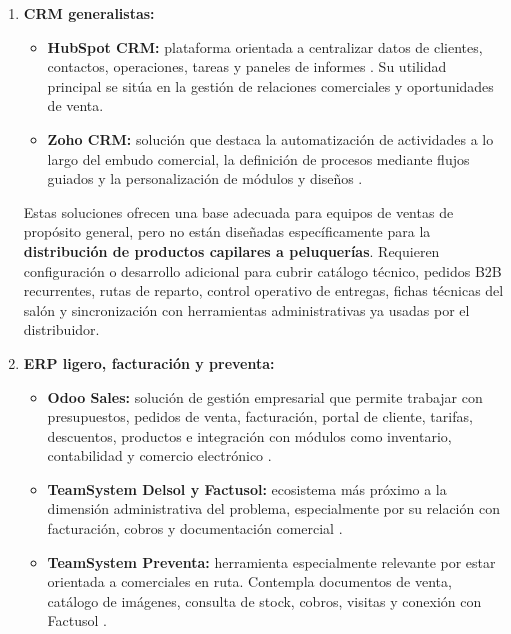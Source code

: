 \begin{enumerate}[label=\textbf{\arabic*.}, leftmargin=1.1cm, itemsep=0.6em, topsep=0.35em]
  \item \textbf{CRM generalistas:}
  \begin{itemize}[topsep=0.1em, itemsep=0.15em]
    \item \textbf{HubSpot CRM:} plataforma orientada a centralizar datos de clientes, contactos, operaciones, tareas y paneles de informes \citep{hubspot-crm}. Su utilidad principal se sitúa en la gestión de relaciones comerciales y oportunidades de venta.
    \item \textbf{Zoho CRM:} solución que destaca la automatización de actividades a lo largo del embudo comercial, la definición de procesos mediante flujos guiados y la personalización de módulos y diseños \citep{zoho-crm-features}.
  \end{itemize}

  Estas soluciones ofrecen una base adecuada para equipos de ventas de propósito general, pero no están diseñadas específicamente para la \textbf{distribución de productos capilares a peluquerías}. Requieren configuración o desarrollo adicional para cubrir catálogo técnico, pedidos B2B recurrentes, rutas de reparto, control operativo de entregas, fichas técnicas del salón y sincronización con herramientas administrativas ya usadas por el distribuidor.

  \item \textbf{ERP ligero, facturación y preventa:}
  \begin{itemize}[topsep=0.1em, itemsep=0.15em]
    \item \textbf{Odoo Sales:} solución de gestión empresarial que permite trabajar con presupuestos, pedidos de venta, facturación, portal de cliente, tarifas, descuentos, productos e integración con módulos como inventario, contabilidad y comercio electrónico \citep{odoo-sales-features}.
    \item \textbf{TeamSystem Delsol y Factusol:} ecosistema más próximo a la dimensión administrativa del problema, especialmente por su relación con facturación, cobros y documentación comercial \citep{sdelsol-factusol}.
    \item \textbf{TeamSystem Preventa:} herramienta especialmente relevante por estar orientada a comerciales en ruta. Contempla documentos de venta, catálogo de imágenes, consulta de stock, cobros, visitas y conexión con Factusol \citep{sdelsol-preventa}.
  \end{itemize}


\end{enumerate}

